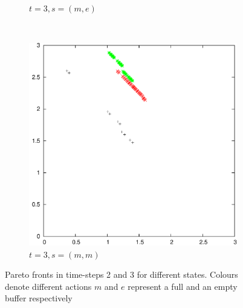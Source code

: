 \documentclass{article}
\begin{document}
\begin{figure}
\begin{subfigure}[b]{0.3\textwidth}
			\caption{$t=3, s=(m,e)$}
			\label{fig:t3s1}
		\end{subfigure}
		~
		\begin{subfigure}[b]{0.3\textwidth}
			\centering
			\includegraphics[width=\textwidth]{images/t3s3}
			\caption{$t=3, s=(m,m)$}
			\label{fig:t3s3}
		\end{subfigure}
		\caption{Pareto fronts in time-steps 2 and 3 for different states.
			Colours denote different actions $m$ and $e$ represent a full and an
			empty buffer respectively}
		\label{fig:fronts_actions}
	\end{figure}
\end{document}
